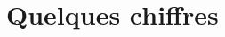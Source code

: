 \documentclass[a4paper, dvipsnames]{article}
\begin{document}

\bigskip

\section{Quelques chiffres}
\end{document}
